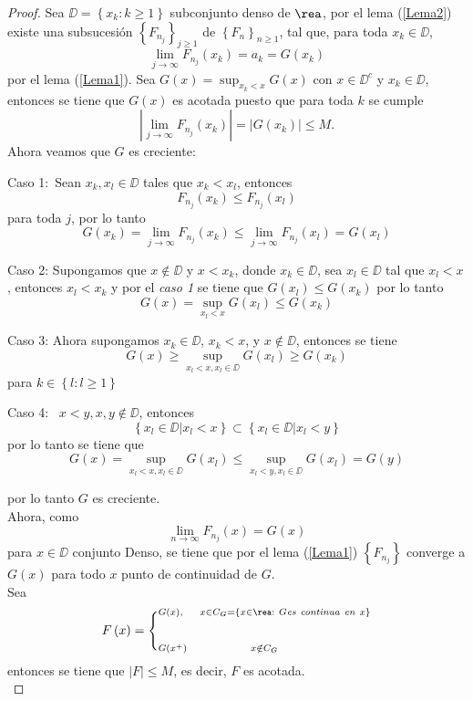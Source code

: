 \begin{proof}
Sea $\DD=\left\{x_{k}:k\geq 1\right\}$ subconjunto denso de
$\rea$, por el lema (\ref{Lema2}) existe una subsucesi\'on
$\left\{F_{n_{j}}\right\}_{j\geq 1}$ de
$\left\{F_{n}\right\}_{n\geq 1}$, tal que, para toda
$x_{k}\in\DD$,\[\lim_{j\rightarrow\infty}F_{n_{j}}\left(x_{k}\right)=a_{k}=G\left(x_{k}\right)\]
por el lema (\ref{Lema1}). Sea
$G\left(x\right)=\sup_{x_{k}<x}G\left(x\right)$ con $x\in\DD^{c}$
y $x_{k}\in\DD$, entonces se tiene que $G\left(x\right)$ es
acotada puesto que para toda $k$ se cumple
\[|\lim_{j\rightarrow\infty}F_{n_{j}}\left(x_{k}\right)|=|G\left(x_{k}\right)|\leq
M.\] Ahora veamos que $G$ es creciente:
\begin{description}
    \item{Caso 1:}\ Sean $x_{k},x_{l}\in\DD$ tales que
    $x_{k}<x_{l}$, entonces
    \[F_{n_{j}}\left(x_{k}\right)\leq F_{n_{j}}\left(x_{l}\right)\] para toda $j$, por lo tanto \[G\left(x_{k}\right)=\lim_{j\rightarrow\infty}F_{n_{j}}\left(x_{k}\right)\leq \lim_{j\rightarrow\infty}F_{n_{j}}\left(x_{l}\right)=G\left(x_{l}\right)\]
    \item{Caso 2:} Supongamos que $x\notin\DD$ y $x<x_{k}$, donde $x_{k}\in\DD$, sea $x_{l}\in\DD$ tal que $x_{l}<x$, entonces $x_{l}<x_{k}$ y por el {\em caso 1} se tiene que $G\left(x_{l}\right)\leq G\left(x_{k}\right)$ por lo tanto \[G\left(x\right)=\sup_{x_{l}<x}G\left(x_{l}\right)\leq G\left(x_{k}\right)\]
    \item{Caso 3:} Ahora supongamos $x_{k}\in\DD$, $x_{k}<x$, y $x\notin\DD$, entonces se tiene \[G\left(x\right)\geq \sup_{x_{l}<x,x_{l}\in\DD}G\left(x_{l}\right)\geq G\left(x_{k}\right)\] para $k\in\left\{l:l\geq 1\right\}$
    \item{Caso 4:} \ $x<y, x,y\notin\DD$, entonces \[\left\{x_{l}\in\DD|x_{l}<x\right\} \subset \left\{x_{l}\in\DD|x_{l}<y\right\} \] por lo tanto se tiene que \[G\left(x\right)= \sup_{x_{l}<x,x_{l}\in\DD}G\left(x_{l}\right) \leq \sup_{x_{l}<y,x_{l}\in\DD}G\left(x_{l}\right)=G\left(y\right)\]
\end{description}
por lo tanto $G$ es creciente.\\

Ahora, como \[\lim_{n\rightarrow\infty}F_{n_{j}}\left(x\right)=G\left(x\right)\]
para $x\in\DD$ conjunto Denso, se tiene que por el lema (\ref{Lema1}) $\left\{F_{n_{j}}\right\}$ converge a $G\left(x\right)$ para todo $x$ punto de continuidad de $G$. \\ Sea \[F\left(x\right)=\Bigg\{_{G\left(x^{+}\right)\ \ \ \ \ \ \ \ \ \ \ \ \ \ \ x\notin C_{G}}^{G\left(x\right),\ \ \ \ x \in C_{G}=\left\{x\in\rea:\ G {\it es\ continua\ en\ }x\right\}}\] entonces se tiene que $|F|\leq M$, es decir, $F$ es acotada.\\


\end{proof}
